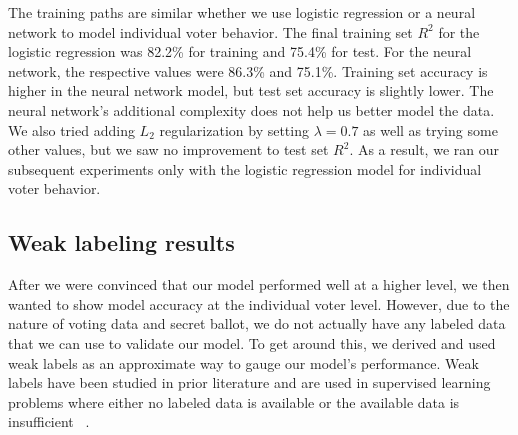 \documentclass[10pt, letterpaper]{article}
\begin{document}
\begin{multicols}{2}
The training paths are similar whether we use logistic regression or a neural network to model individual voter behavior. The final training set $R^2$ for the logistic regression was 82.2\% for training and 75.4\% for test. For the neural network, the respective values were 86.3\% and 75.1\%. Training set accuracy is higher in the neural network model, but test set accuracy is slightly lower. The neural network's additional complexity does not help us better model the data. We also tried adding $L_2$ regularization by setting $\lambda = 0.7$ as well as trying some other values, but we saw no improvement to test set $R^2$. As a result, we ran our subsequent experiments only with the logistic regression model for individual voter behavior.

\subsection{Weak labeling results}

After we were convinced that our model performed well at a higher level, we then wanted to show model accuracy at the individual voter level. However, due to the nature of voting data and secret ballot, we do not actually have any labeled data that we can use to validate our model. To get around this, we derived and used weak labels as an approximate way to gauge our model's performance. Weak labels have been studied in prior literature and are used in supervised learning problems where either no labeled data is available or the available data is insufficient ~\cite{rbvr2017}.


\end{multicols}
\end{document}
